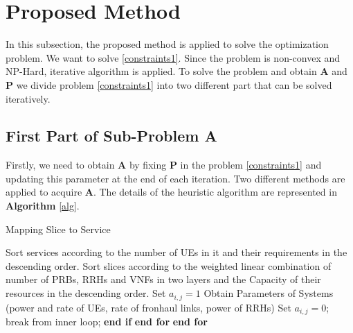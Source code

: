 \documentclass[conference]{IEEEtran}
\begin{document}
\section{Proposed Method}\label{proposedmethod}
In this subsection, the proposed method is applied to solve the optimization problem.
We want to solve \eqref{constraints1}. Since the problem is non-convex and NP-Hard, iterative algorithm is applied.
To solve the problem and obtain $\boldsymbol{A}$ and $\boldsymbol{P}$ we divide problem \eqref{constraints1} into 
two different part that can be solved iteratively.  
\subsection{First Part of Sub-Problem A}\label{firstsub}
Firstly, we need to obtain $\boldsymbol{A}$ by fixing $\boldsymbol{P}$ in the problem \eqref{constraints1} and updating this parameter at the end of each iteration. Two different methods are applied to acquire $\boldsymbol{A}$. 
The details of the heuristic algorithm are represented in \textbf{Algorithm} \eqref{alg}.  
\begin{algorithm}
\caption{Mapping Slice to Service}\label{alg}
\begin{algorithmic}[1]
\State Sort services according to the number of UEs in it and their requirements in the descending order.
\State Sort slices according to the weighted linear combination of number of PRBs, RRHs and VNFs in two layers and the Capacity of their resources in the descending order. 
\State Set $a_{i,j} = 1$
\State Obtain Parameters of Systems (power and rate of UEs, rate of fronhaul links, power of RRHs)
\State Set $a_{i,j} = 0$;
\Else
\State break from inner loop;
\EndIf 
\State \textbf{end if}
\EndFor 
\State \textbf{end for}
\EndFor 
\State \textbf{end for}
\end{algorithmic}
\end{algorithm}
\end{document}
